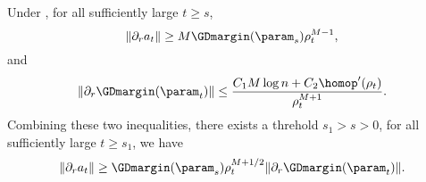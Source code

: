 \begin{lemma}
    \label{lem: Inequalities between a and gamma GD}
    Under , for all sufficiently large $t\ge s$,
    \begin{equation}
    \label{eq: lowerbound partial_r a GD}
        \| \partial_r a_t\| \ge M \GDmargin(\param_s) \rho_t^{M-1}, 
    \end{equation}
    and 
    \begin{equation}
    \label{eq: upperbound partial_r gamma^c GD}
        \| \partial_r \GDmargin (\param_t)\| \le \frac{C_1 M \log n + C_2 \homop'(\rho_t)}{\rho_t^{M+1}}. 
    \end{equation}
    Combining these two inequalities, there exists a threhold $s_1>s>0$, for all sufficiently large $t \ge s_1$, we have 
    \begin{equation}
    \label{eq: partial_r a large partial_r gamma^c GD}
        \| \partial_r a_t\| \ge  \GDmargin(\param_s) \rho_t^{M+1 /2}  \| \partial_r \GDmargin (\param_t)\|.
    \end{equation}
\end{lemma}
